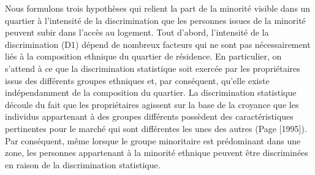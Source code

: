 \documentclass{Revue-economique} %
\begin{document}
\begin{Article}
Nous formulons trois hypothèses qui relient la part de la minorité visible dans un quartier à l’intensité de la discrimination que les personnes issues de la minorité peuvent subir dans l’accès au logement. Tout d’abord, l’intensité de la discrimination (D1) dépend de nombreux facteurs qui ne sont pas nécessairement liés à la composition ethnique du quartier de résidence. En particulier, on s’attend à ce que la discrimination statistique soit exercée par les propriétaires issus des différents groupes ethniques et, par conséquent, qu’elle existe indépendamment de la composition du quartier. La discrimination statistique découle du fait que les propriétaires agissent sur la base de la croyance que les individus appartenant à des groupes différents possèdent des caractéristiques pertinentes pour le marché qui sont différentes les unes des autres (Page [1995]). Par conséquent, même lorsque le groupe minoritaire est prédominant dans une zone, les personnes appartenant à la minorité ethnique peuvent être discriminées en raison de la discrimination statistique.

\end{Article}
\end{document}
